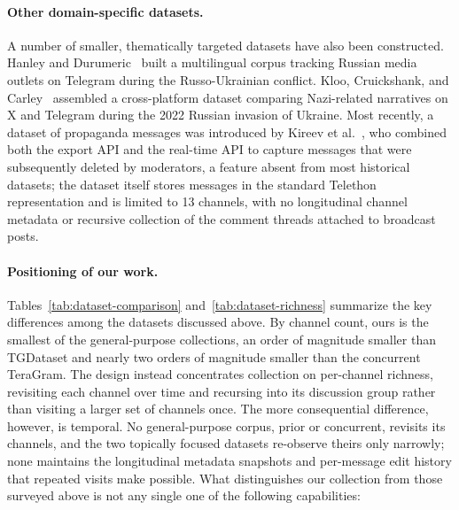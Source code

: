 \paragraph{Other domain-specific datasets.}
A number of smaller, thematically targeted datasets have also been constructed.
Hanley and Durumeric~\cite{hanley2024} built a multilingual corpus tracking Russian media outlets on Telegram during the Russo-Ukrainian conflict.
Kloo, Cruickshank, and Carley~\cite{kloo2024} assembled a cross-platform dataset comparing Nazi-related narratives on X and Telegram during the 2022 Russian invasion of Ukraine.
Most recently, a dataset of propaganda messages was introduced by Kireev et al.~\cite{propaganda2025}, who combined both the export API and the real-time API to capture messages that were subsequently deleted by moderators, a feature absent from most historical datasets; the dataset itself stores messages in the standard Telethon representation and is limited to 13 channels, with no longitudinal channel metadata or recursive collection of the comment threads attached to broadcast posts.

\paragraph{Positioning of our work.}
Tables~\ref{tab:dataset-comparison} and~\ref{tab:dataset-richness} summarize the key differences among the datasets discussed above.
By channel count, ours is the smallest of the general-purpose collections, an order of magnitude smaller than TGDataset and nearly two orders of magnitude smaller than the concurrent TeraGram. The design instead concentrates collection on per-channel richness, revisiting each channel over time and recursing into its discussion group rather than visiting a larger set of channels once. The more consequential difference, however, is temporal. No general-purpose corpus, prior or concurrent, revisits its channels, and the two topically focused datasets re-observe theirs only narrowly; none maintains the longitudinal metadata snapshots and per-message edit history that repeated visits make possible. What distinguishes our collection from those surveyed above is not any single one of the following capabilities:

